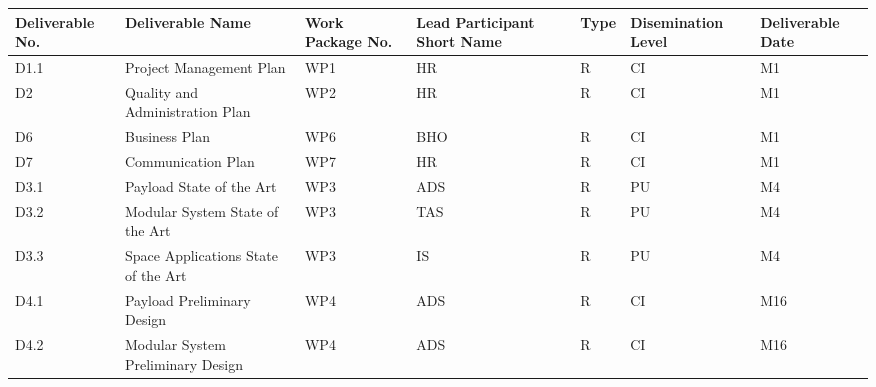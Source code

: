 \begin{longtable}[H]{p{1.8cm} >{\raggedright\arraybackslash}p{2.5cm} p{1.3cm} p{1.8cm} p{0.8cm} p{2.1cm} p{1.8cm}}
	\toprule[2pt]
	
	\textbf{Deliverable No.} & \textbf{Deliverable Name} & \textbf{Work Package No.} & \textbf{Lead Participant Short Name} & \textbf{Type} & \textbf{Disemination Level} & \textbf{Deliverable Date} \\
	
	\midrule[1.5pt] 
	\endhead
	
	D1.1 & Project Management Plan & WP1 & HR & R & CI & M1  \vspace{0.2cm} \\
	
	\midrule
	
	D2 & Quality and Administration Plan & WP2 & HR & R & CI & M1  \vspace{0.2cm} \\
	
	\midrule

	D6 & Business Plan & WP6 & BHO & R & CI & M1  \vspace{0.2cm} \\
	
	\midrule
	
	D7 & Communication Plan & WP7 & HR & R & CI & M1  \vspace{0.2cm} \\

	\midrule

 	D3.1 & Payload State of the Art & WP3 & ADS & R & PU & M4  \vspace{0.2cm} \\

 	\midrule

	D3.2 & Modular System State of the Art  & WP3 & TAS & R & PU & M4  \vspace{0.2cm} \\
	
	\midrule
	
	D3.3 & Space Applications State of the Art & WP3 & IS & R  & PU  & M4 \vspace{0.2cm} \\

	\midrule

 	D4.1 & Payload Preliminary Design  & WP4 & ADS & R & CI & M16 \vspace{0.2cm} \\

 	\midrule

	D4.2 & Modular System Preliminary Design & WP4 & ADS & R & CI & M16 \vspace{0.2cm} \\
	

\end{longtable}
